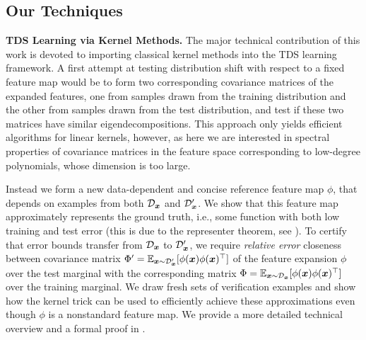 \documentclass[11pt]{article} %
\numberwithin{equation}{section}
\begin{document}
\subsection{Our Techniques}

\noindent\textbf{TDS Learning via Kernel Methods.} 
The major technical contribution of this work is devoted to importing classical kernel methods into the TDS learning framework.  A first attempt at testing distribution shift with respect to a fixed feature map would be to form two corresponding covariance matrices of the expanded features, one from samples drawn from the training distribution and the other from samples drawn from the test distribution, and test if these two matrices have similar eigendecompositions. This approach only yields efficient algorithms for linear kernels, however, as here we are interested in spectral properties of covariance matrices in the feature space corresponding to low-degree polynomials, whose dimension is too large. 



Instead we form a new data-dependent and concise reference feature map $\phi$, that depends on examples from both ${\mathcal{D}}_{{\bm{x}}}$ and ${\mathcal{D}}_{{\bm{x}}}'$. We show that this feature map approximately represents the ground truth, i.e., some function with both low training and test error (this is due to the representer theorem, see ). To certify that error bounds transfer from ${\mathcal{D}}_{{\bm{x}}}$ to ${\mathcal{D}}_{{\bm{x}}}'$, we require {\em relative error} closeness between  covariance matrix $\Phi' = \mathbb{E}_{{\bm{x}}\sim {\mathcal{D}}_{{\bm{x}}}'}[\phi({\bm{x}})\phi({\bm{x}})^\top]$ of the feature expansion $\phi$ over the test marginal with the corresponding matrix $\Phi = \mathbb{E}_{{\bm{x}}\sim {\mathcal{D}}_{{\bm{x}}}}[\phi({\bm{x}})\phi({\bm{x}})^\top]$ over the training marginal. We draw fresh sets of verification examples and show how the kernel trick can be used to efficiently achieve these approximations even though $\phi$ is a nonstandard feature map. We provide a more detailed technical overview and a formal proof in .
\end{document}
